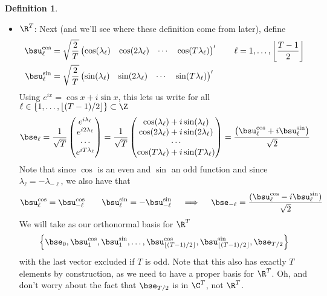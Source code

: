 \documentclass[12pt]{article}
\theoremstyle{plain}
\theoremstyle{definition}
\newtheorem{defn}[thm]{Definition}
\theoremstyle{remark}
\begin{document}
\begin{defn}
\begin{itemize}
  \item $\R^T$:
    Next (and we'll see where these definition come from later), define
    \begin{align*}
      \bsu_\ell^{\cos} &=
      \sqrt{\frac{2}{T}}
      \begin{pmatrix}
        \cos(\lambda_\ell) &
        \cos(2\lambda_\ell) &
        \cdots &
        \cos(T\lambda_\ell)
      \end{pmatrix}'
      \qquad \ell = 1,\ldots,\left\lfloor\frac{T-1}{2}\right\rfloor
      \\
      \bsu_\ell^{\sin} &=
      \sqrt{\frac{2}{T}}
      \begin{pmatrix}
        \sin(\lambda_\ell) &
        \sin(2\lambda_\ell) &
        \cdots &
        \sin(T\lambda_\ell)
      \end{pmatrix}'
    \end{align*}
    Using $e^{ix}=\cos x + i\sin x$, this lets us write for all
    $\ell\in\{1,\ldots,\lfloor (T-1)/2\rfloor\}\subset\Z$
    \begin{align*}
      \bse_\ell
      &= \frac{1}{\sqrt{T}}
      \begin{pmatrix}
        e^{i\lambda_\ell} \\
        e^{i2\lambda_\ell}\\
        \cdots \\
        e^{iT\lambda_\ell}
      \end{pmatrix}
      = \frac{1}{\sqrt{T}}
      \begin{pmatrix}
        \cos(\lambda_\ell) + i \sin(\lambda_\ell)\\
        \cos(2\lambda_\ell) + i \sin(2\lambda_\ell)\\
        \cdots \\
        \cos(T\lambda_\ell) + i \sin(T\lambda_\ell)
      \end{pmatrix}
      = \frac{%
      \left(
      \bsu_\ell^{\cos} + i\bsu_\ell^{\sin}
      \right)
      }{\sqrt{2}}
    \end{align*}
    Note that since $\cos$ is an even and $\sin$ an odd function and
    since $\lambda_\ell=-\lambda_{-\ell}$, we also have that
    \begin{align*}
      \bsu^{\cos}_\ell = \bsu^{\cos}_{-\ell}
      \qquad
      \bsu^{\sin}_\ell = -\bsu^{\sin}_{-\ell}
      \quad\implies\quad
      \bse_{-\ell} =
      \frac{(\bsu_\ell^{\cos} - i\bsu_\ell^{\sin})}{\sqrt{2}}
    \end{align*}
    We will take as our orthonormal basis for $\R^T$
    \begin{align*}
      \left\{\bse_0,\bsu^{\cos}_1,\bsu^{\sin}_1,\ldots,
        \bsu^{\cos}_{\lfloor (T-1)/2\rfloor},
        \bsu^{\sin}_{\lfloor (T-1)/2\rfloor},
        \bse_{T/2}\right\}
    \end{align*}
    with the last vector excluded if $T$ is odd.
    Note that this also has exactly $T$ elements by construction, as we
    need to have a proper basis for $\R^T$.
    Oh, and don't worry about the fact that $\bse_{T/2}$ is in $\C^T$,
    not $\R^T$.
\end{itemize}
\end{defn}
\end{document}
